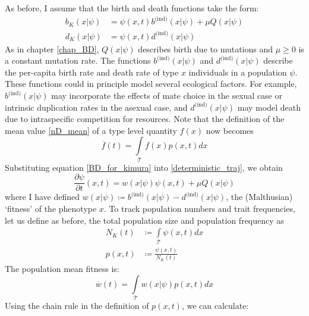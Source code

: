 As before, I assume that the birth and death functions take the form:
\begin{equation}
\label{BD_for_kimura}
\begin{aligned}
b_K(x|\psi) &=  \psi(x,t)b^{\textrm{(ind)}}(x|\psi) + \mu Q(x|\psi)\\
d_K(x|\psi) &= \psi(x,t)d^{\textrm{(ind)}}(x|\psi)
\end{aligned}
\end{equation}
As in chapter \ref{chap_BD}, $ Q(x|\psi)$ describes birth due to mutations and $\mu \geq 0$ is a constant mutation rate. The functions $b^{\textrm{(ind)}}(x|\psi)$ and $d^{\textrm{(ind)}}(x|\psi)$ describe the per-capita birth rate and death rate of type $x$ individuals in a population $\psi$. These functions could in principle model several ecological factors. For example,  $b^{\textrm{(ind)}}(x|\psi)$ may incorporate the effects of mate choice in the sexual case or intrinsic duplication rates in the asexual case, and $d^{\textrm{(ind)}}(x|\psi)$ may model death due to intraspecific competition for resources. Note that the definition of the mean value \eqref{nD_mean} of a type level quantity $f(x)$ now becomes
\begin{equation*}
\overline{f}(t) = \int\limits_{\mathcal{T}}f(x)p(x,t)dx
\end{equation*}
Substituting equation \eqref{BD_for_kimura} into \eqref{deterministic_traj}, we obtain
\begin{equation}
\label{PDE_for_kimura}
\frac{\partial \psi}{\partial t}(x,t) = w(x|\psi)\psi(x,t) + \mu Q(x|\psi)
\end{equation}
where I have defined $w(x|\psi) \coloneqq b^{\textrm{(ind)}}(x|\psi) - d^{\textrm{(ind)}}(x|\psi)$, the (Malthusian) `fitness' of the phenotype $x$. To track population numbers and trait frequencies, let us define as before, the total population size and population frequency as
\begin{equation}
\label{pop_size_and_freq_for_kimura}
\begin{aligned}
N_K(t) &\coloneqq \int\limits_{\mathcal{T}}\psi(x,t)dx\\
p(x,t) &\coloneqq \frac{\psi(x,t)}{N_K(t)}
\end{aligned}
\end{equation}
The population mean fitness is:
\begin{equation}
\label{mean_fitness_for_kimura}
\overline{w}(t) = \int\limits_{\mathcal{T}}w(x|\psi)p(x,t)dx
\end{equation}
Using the chain rule in the definition of $p(x,t)$, we can calculate:
